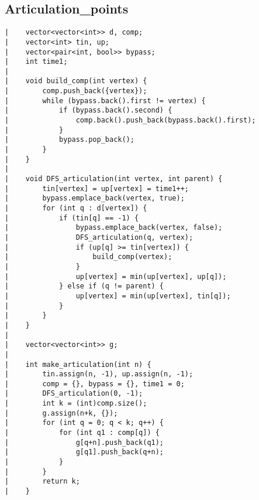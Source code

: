 \documentclass[a4paper, 10pt]{article}
\begin{document}
\begin{center}

\section*{Articulation\_points}
\begin{verbatim}
|    vector<vector<int>> d, comp;
|    vector<int> tin, up;
|    vector<pair<int, bool>> bypass;
|    int time1;
|    
|    void build_comp(int vertex) {
|        comp.push_back({vertex});
|        while (bypass.back().first != vertex) {
|            if (bypass.back().second) {
|                comp.back().push_back(bypass.back().first);
|            }
|            bypass.pop_back();
|        }
|    }
|    
|    void DFS_articulation(int vertex, int parent) {
|        tin[vertex] = up[vertex] = time1++;
|        bypass.emplace_back(vertex, true);
|        for (int q : d[vertex]) {
|            if (tin[q] == -1) {
|                bypass.emplace_back(vertex, false);
|                DFS_articulation(q, vertex);
|                if (up[q] >= tin[vertex]) {
|                    build_comp(vertex);
|                }
|                up[vertex] = min(up[vertex], up[q]);
|            } else if (q != parent) {
|                up[vertex] = min(up[vertex], tin[q]);
|            }
|        }
|    }
|    
|    vector<vector<int>> g;
|    
|    int make_articulation(int n) {
|        tin.assign(n, -1), up.assign(n, -1);
|        comp = {}, bypass = {}, time1 = 0;
|        DFS_articulation(0, -1);
|        int k = (int)comp.size();
|        g.assign(n+k, {});
|        for (int q = 0; q < k; q++) {
|            for (int q1 : comp[q]) {
|                g[q+n].push_back(q1);
|                g[q1].push_back(q+n);
|            }
|        }
|        return k;
|    }
\end{verbatim}


\end{center}
\end{document}
